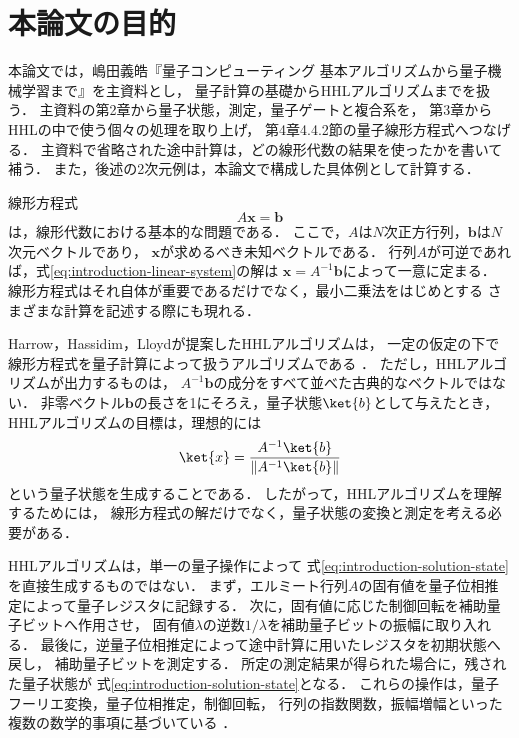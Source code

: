 \section{本論文の目的}
\label{sec:purpose}

本論文では，嶋田義皓『量子コンピューティング
基本アルゴリズムから量子機械学習まで』\cite{shimada2020}を主資料とし，
量子計算の基礎からHHLアルゴリズムまでを扱う．
主資料の第2章から量子状態，測定，量子ゲートと複合系を，
第3章からHHLの中で使う個々の処理を取り上げ，
第4章4.4.2節の量子線形方程式へつなげる．
主資料で省略された途中計算は，どの線形代数の結果を使ったかを書いて補う．
また，後述の2次元例は，本論文で構成した具体例として計算する．

線形方程式
\begin{equation}
  A\bm{x}=\bm{b}
  \label{eq:introduction-linear-system}
\end{equation}
は，線形代数における基本的な問題である．
ここで，$A$は$N$次正方行列，$\bm{b}$は$N$次元ベクトルであり，
$\bm{x}$が求めるべき未知ベクトルである．
行列$A$が可逆であれば，式\eqref{eq:introduction-linear-system}の解は
$\bm{x}=A^{-1}\bm{b}$によって一意に定まる．
線形方程式はそれ自体が重要であるだけでなく，最小二乗法をはじめとする
さまざまな計算を記述する際にも現れる．

Harrow，Hassidim，Lloydが提案したHHLアルゴリズムは，
一定の仮定の下で線形方程式を量子計算によって扱うアルゴリズムである
\cite{shimada2020}．
ただし，HHLアルゴリズムが出力するものは，
$A^{-1}\bm{b}$の成分をすべて並べた古典的なベクトルではない．
非零ベクトル$\bm{b}$の長さを1にそろえ，量子状態$\ket{b}$として与えたとき，
HHLアルゴリズムの目標は，理想的には
\begin{equation}
  \ket{x}
  =
  \frac{A^{-1}\ket{b}}
       {\lVert A^{-1}\ket{b}\rVert}
  \label{eq:introduction-solution-state}
\end{equation}
という量子状態を生成することである．
したがって，HHLアルゴリズムを理解するためには，
線形方程式の解だけでなく，量子状態の変換と測定を考える必要がある．

HHLアルゴリズムは，単一の量子操作によって
式\eqref{eq:introduction-solution-state}を直接生成するものではない．
まず，エルミート行列$A$の固有値を量子位相推定によって量子レジスタに記録する．
次に，固有値に応じた制御回転を補助量子ビットへ作用させ，
固有値$\lambda$の逆数$1/\lambda$を補助量子ビットの振幅に取り入れる．
最後に，逆量子位相推定によって途中計算に用いたレジスタを初期状態へ戻し，
補助量子ビットを測定する．
所定の測定結果が得られた場合に，残された量子状態が
式\eqref{eq:introduction-solution-state}となる．
これらの操作は，量子フーリエ変換，量子位相推定，制御回転，
行列の指数関数，振幅増幅といった複数の数学的事項に基づいている
\cite{shimada2020}．

